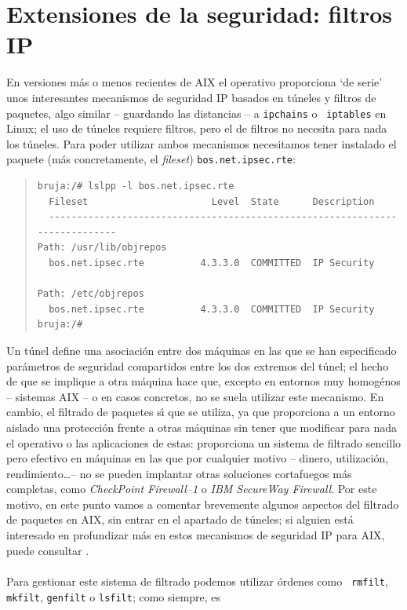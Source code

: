 \section{Extensiones de la seguridad: filtros IP}
En versiones m\'as o menos recientes de AIX el operativo proporciona `de serie' unos interesantes mecanismos de seguridad IP basados en t\'uneles y filtros de 
paquetes, algo similar -- guardando las distancias -- a {\tt ipchains} o {\tt
iptables} en Linux; el uso de t\'uneles requiere filtros, pero el de filtros no
necesita para nada los t\'uneles. Para poder utilizar ambos mecanismos 
necesitamos tener instalado el paquete (m\'as concretamente, el {\it fileset}) 
{\tt bos.net.ipsec.rte}:
\begin{quote}
\begin{verbatim}
bruja:/# lslpp -l bos.net.ipsec.rte
  Fileset                      Level  State      Description
  ----------------------------------------------------------------------------
Path: /usr/lib/objrepos
  bos.net.ipsec.rte          4.3.3.0  COMMITTED  IP Security

Path: /etc/objrepos
  bos.net.ipsec.rte          4.3.3.0  COMMITTED  IP Security
bruja:/#
\end{verbatim}
\end{quote}
Un t\'unel define una asociaci\'on entre dos m\'aquinas en las que se han
especificado par\'ametros de seguridad compartidos entre los dos extremos del
t\'unel; el hecho de que se implique a otra m\'aquina hace que, excepto en 
entornos muy homog\'enos -- sistemas AIX -- o en casos concretos, no se suela
utilizar este mecanismo. En cambio, el filtrado de paquetes s\'{\i} que se 
utiliza, ya que proporciona a un entorno aislado una protecci\'on frente a 
otras m\'aquinas sin tener que modificar para nada el operativo o las 
aplicaciones de estas: proporciona un sistema de filtrado sencillo pero 
efectivo en m\'aquinas en las que por cualquier motivo -- dinero, utilizaci\'on,
rendimiento\ldots -- no se pueden implantar otras soluciones cortafuegos m\'as
completas, como {\it CheckPoint Firewall--1} o {\it IBM SecureWay Firewall}. Por
este motivo, en este punto vamos a comentar brevemente algunos aspectos del 
filtrado de paquetes en AIX, sin entrar en el apartado de t\'uneles; si alguien
est\'a interesado en profundizar m\'as en estos mecanismos de seguridad IP para
AIX, puede consultar \cite{kn:ibm97b}.\\
\\Para gestionar este sistema de filtrado podemos utilizar \'ordenes como {\tt
rmfilt}, {\tt mkfilt}, {\tt genfilt} o {\tt lsfilt}; como siempre, es 
